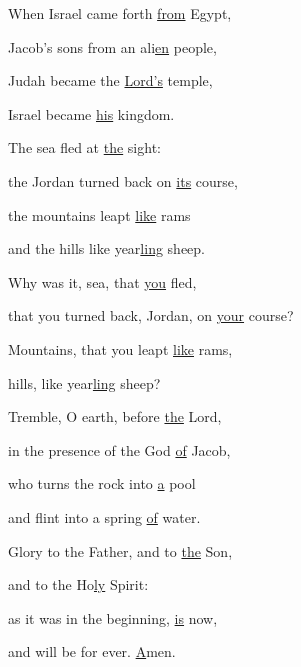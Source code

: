 \noindent When Israel came forth \uline{from} Egypt,~\GreStar{}~\nopagebreak

Jacob’s sons from an ali\uline{en} people,

\noindent Judah became the \uline{Lord’s} temple,~\GreStar{}~\nopagebreak

Israel became \uline{his} kingdom.

\noindent The sea fled at \uline{the} sight:~\GreStar{}~\nopagebreak

the Jordan turned back on \uline{its} course,

\noindent the mountains leapt \uline{like} rams~\GreStar{}~\nopagebreak

and the hills like year\uline{ling} sheep.

\noindent Why was it, sea, that \uline{you} fled,~\GreStar{}~\nopagebreak

that you turned back, Jordan, on \uline{your} course?

\noindent Mountains, that you leapt \uline{like} rams,~\GreStar{}~\nopagebreak

hills, like year\uline{ling} sheep?

\noindent Tremble, O earth, before \uline{the} Lord,~\GreStar{}~\nopagebreak

in the presence of the God \uline{of} Jacob,

\noindent who turns the rock into \uline{a} pool~\GreStar{}~\nopagebreak

and flint into a spring \uline{of} water.

\noindent Glory to the Father, and to \uline{the} Son,~\GreStar{}~\nopagebreak

and to the Ho\uline{ly} Spirit:

\noindent as it was in the beginning, \uline{is} now,~\GreStar{}~\nopagebreak

and will be for ever. \uline{A}men.
